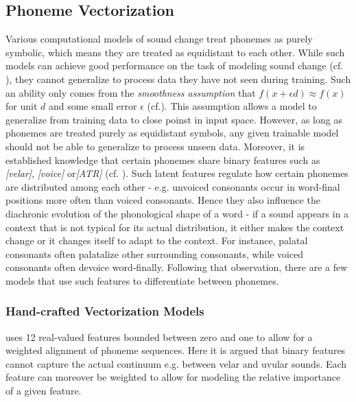 \documentclass[6pt]{article}
\begin{document}
\subsection{Phoneme Vectorization}
\label{Phoneme Vectorization}
Various computational models of sound change treat phonemes as purely symbolic, which means they are treated as equidistant to each other. While such models can achieve good performance on the task of modeling sound change (cf. \cite{bouchard2007probabilistic,bouchard2013automated}), they cannot generalize to process data they have not seen during training. Such an ability only comes from the \textit{smoothness assumption} that $f(x + \epsilon d) \approx f(x)$ for unit $d$ and some small error $\epsilon$ (cf.\cite[p. 555]{Goodfellow-et-al-2016-Book}). This assumption allows a model to generalize from training data to close poinst in input space.  However, as long as phonemes are treated purely as equidistant symbols, any given trainable model should not be able to generalize to process unseen data.
Moreover, it is established knowledge that certain phonemes share binary features such as \textit{[velar]}, \textit{[voice]}  or\textit{[ATR]} (cf. \cite{chomsky1968sound}). Such latent features regulate how certain phonemes are distributed among each other - e.g. unvoiced consonants occur in word-final positions more often than voiced consonants. Hence they also influence the diachronic evolution of the phonological shape of a word - if a sound appears in a context that is not typical for its actual distribution, it either makes the context change or it changes itself to adapt to the context. For instance, palatal consonants often palatalize other surrounding consonants, while voiced consonants often devoice word-finally.
Following that observation, there are a few models that use such features to differentiate between phonemes. 

\subsubsection{Hand-crafted Vectorization Models}



\cite{kondrak2000new} uses 12 real-valued features bounded between zero and one to allow for a weighted alignment of phoneme sequences. Here it is argued that binary features cannot capture the actual continuum e.g. between velar and uvular sounds. Each feature can moreover be weighted to allow for modeling the relative importance of a given feature.
\end{document}
